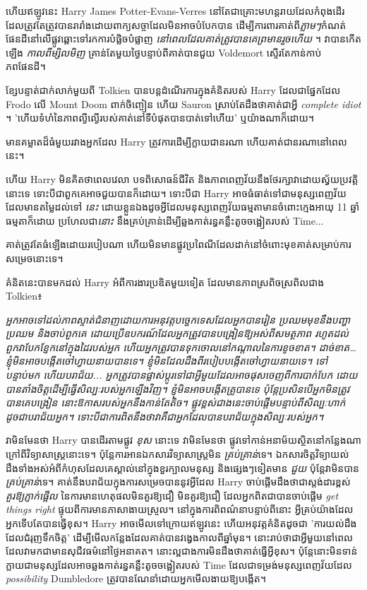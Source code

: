 ហើយឥឡូវនេះ Harry James Potter-Evans-Verres នៅតែជាគ្រោះមហន្តរាយដែលកំពុងដើរ ​​ដែលត្រូវតែត្រូវបានរារាំងដោយពាក្យសច្ចាដែលមិនអាចបំបែកបាន ដើម្បីការពារគាត់ពី\emph{ភ្លាមៗ}កំណត់ផែនដីនៅលើផ្លូវឆ្ពោះទៅរកការបំផ្លិចបំផ្លាញ \emph{ នៅពេលដែលគាត់ត្រូវបានគេព្រមានរួចហើយ } ។ វាបានកើតឡើង \emph{កាលពីម្សិលមិញ} គ្រាន់តែមួយថ្ងៃបន្ទាប់ពីគាត់បានជួយ Voldemort ស្ទើរតែកាន់កាប់ភពផែនដី។

ខ្សែបន្ទាត់ជាក់លាក់មួយពី Tolkien បានបន្តដំណើរការក្នុងគំនិតរបស់ Harry ដែលជាផ្នែកដែល Frodo លើ Mount Doom ពាក់ចិញ្ចៀន ហើយ Sauron ស្រាប់តែដឹងថាគាត់ជាអ្វី \emph{complete idiot} ។ 'ហើយ​ទំហំ​នៃ​ភាព​ល្ងីល្ងើ​របស់​គាត់​នៅ​ទី​បំផុត​បាន​បាត់​ទៅ​ហើយ' ឬ​យ៉ាង​ណា​ក៏​ដោយ។

មានគម្លាតដ៏ធំមួយរវាងអ្នកដែល Harry ត្រូវការដើម្បីក្លាយជានរណា ហើយគាត់ជានរណានៅពេលនេះ។

ហើយ Harry មិនគិតថាពេលវេលា បទពិសោធន៍ជីវិត និងភាពពេញវ័យនឹងថែរក្សាវាដោយស្វ័យប្រវត្តិនោះទេ ទោះបីជាពួកគេអាចជួយបានក៏ដោយ។ ទោះបីជា Harry អាចធំធាត់ទៅជាមនុស្សពេញវ័យដែលមានតម្លៃដល់ទៅ \emph{នេះ} ដោយខ្លួនឯងដូចអ្វីដែលមនុស្សពេញវ័យធម្មតាមានចំពោះក្មេងអាយុ 11 ឆ្នាំធម្មតាក៏ដោយ ប្រហែលជា\emph{នោះ} នឹងគ្រប់គ្រាន់ដើម្បីឆ្លងកាត់រន្ធគន្លឹះតូចចង្អៀតរបស់ Time...

គាត់ត្រូវតែធំឡើងដោយរបៀបណា ហើយមិនមានផ្លូវប្រពៃណីដែលដាក់នៅចំពោះមុខគាត់សម្រាប់ការសម្រេចនោះទេ។

គំនិតនេះបានមកដល់ Harry អំពីការងារប្រឌិតមួយទៀត ដែលមានភាពស្រពិចស្រពិលជាង Tolkien៖

\emph{អ្នកអាចទៅដល់ភាពស្ទាត់ជំនាញដោយការអនុវត្តបច្ចេកទេសដែលអ្នកបានរៀន ប្រឈមមុខនឹងបញ្ហាប្រឈម និងចាប់ពួកគេ ដោយប្រើឧបករណ៍ដែលអ្នកត្រូវបានបង្រៀនឱ្យអស់ពីសមត្ថភាព រហូតដល់ពួកវាបែកខ្ញែកនៅក្នុងដៃរបស់អ្នក ហើយអ្នកត្រូវបានទុកចោលនៅកណ្តាលនៃការខូចខាត។ ដាច់ខាត… ខ្ញុំមិនអាចបង្កើតចៅហ្វាយនាយបានទេ។ ខ្ញុំមិនដែលដឹងពីរបៀបបង្កើតចៅហ្វាយនាយទេ។ ទៅ បន្ទាប់មក ហើយបរាជ័យ... អ្នកត្រូវបានផ្លាស់ប្តូរទៅជាអ្វីមួយដែលអាចផុសចេញពីការបាក់បែក ដោយបានតាំងចិត្តដើម្បីធ្វើសិល្បៈរបស់អ្នកឡើងវិញ។ ខ្ញុំ​មិន​អាច​បង្កើត​គ្រូ​បាន​ទេ ប៉ុន្តែ​ប្រសិន​បើ​អ្នក​មិន​ត្រូវ​បាន​គេ​បង្រៀន នោះ​ឱកាស​របស់​អ្នក​នឹង​កាន់​តែ​តិច។ ផ្លូវខ្ពស់ជាងនេះចាប់ផ្តើមបន្ទាប់ពីសិល្បៈហាក់ដូចជាបរាជ័យអ្នក។ ទោះបីជាការពិតនឹងថាវាគឺជាអ្នកដែលបានបរាជ័យក្នុងសិល្បៈរបស់អ្នក។}

វាមិនមែនថា Harry បានដើរតាមផ្លូវ \emph{ខុស} នោះទេ វាមិនមែនថា ផ្លូវទៅកាន់អនាម័យស្ថិតនៅកន្លែងណាក្រៅពីវិទ្យាសាស្ត្រនោះទេ។ ប៉ុន្តែការអានឯកសារវិទ្យាសាស្ត្រមិន \emph{គ្រប់គ្រាន់}ទេ។ ឯកសារចិត្តវិទ្យាយល់ដឹងទាំងអស់អំពីកំហុសដែលគេស្គាល់នៅក្នុងខួរក្បាលមនុស្ស និងផ្សេងៗទៀតមាន \emph{ជួយ} ប៉ុន្តែវាមិនបាន \emph{គ្រប់គ្រាន់}ទេ។ គាត់នឹងបរាជ័យក្នុងការសម្រេចបាននូវអ្វីដែល Harry ចាប់ផ្តើមដឹងថាជាស្តង់ដារខ្ពស់ \emph{គួរឱ្យភ្ញាក់ផ្អើល} នៃការមានហេតុផលមិនគួរឱ្យជឿ មិនគួរឱ្យជឿ ដែលអ្នកពិតជាបានចាប់ផ្តើម \emph{get things right} ផ្ទុយពីការមានភាសាងាយស្រួល។ នៅក្នុងការពិពណ៌នាបន្ទាប់ពីនោះ អ្វីគ្រប់យ៉ាងដែលអ្នកទើបតែបានធ្វើខុស។ Harry អាចមើលទៅក្រោយឥឡូវនេះ ហើយអនុវត្តគំនិតដូចជា 'ការយល់ដឹងដែលជំរុញទឹកចិត្ត' ដើម្បីមើលកន្លែងដែលគាត់បានវង្វេងកាលពីឆ្នាំមុន។ នោះ​រាប់​ថា​ជា​អ្វី​មួយ​នៅ​ពេល​ដែល​វា​មក​ជា​មាន​សុជីវធម៌​នៅ​ថ្ងៃ​អនាគត។ នោះ​ល្អ​ជាង​ការ​មិន​ដឹង​ថា​គាត់​ធ្វើ​អ្វី​ខុស។ ប៉ុន្តែនោះមិនទាន់ក្លាយជាមនុស្សដែលអាចឆ្លងកាត់រន្ធគន្លឹះតូចចង្អៀតរបស់ Time ដែលជាទម្រង់មនុស្សពេញវ័យដែល \emph{possibility} Dumbledore ត្រូវបានណែនាំដោយអ្នកមើលងាយឱ្យបង្កើត។

